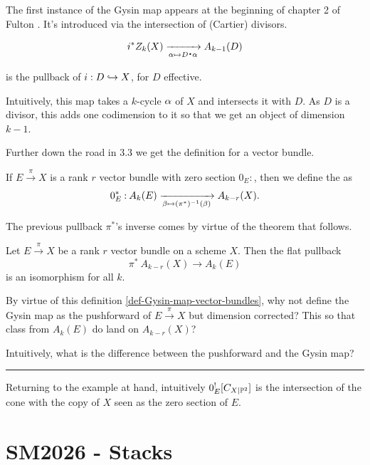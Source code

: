 \documentclass[12pt]{memoir}
\begin{document}
The first instance of the Gysin map appears at the beginning of chapter 2 of Fulton \cite{FultonIntersectionTheory}. It's introduced via the intersection of (Cartier) divisors.

\[
    i^\ast Z_k(X)\xrightarrow[\al\mapsto D\.\al]{} A_{k-1}(D)
\]

is the pullback of \(i:D\hookrightarrow X\), for \(D\) effective.\par
Intuitively, this map takes a \(k\)-cycle \(\alpha\) of \(X\) and intersects it with \(D\). As \(D\) is a divisor, this adds one codimension to it so that we get an object of dimension \(k-1\).\par
Further down the road in 3.3 we get the definition for a vector bundle.

\begin{Def}\label{def-Gysin-map-vector-bundles}
    If \(E\xrightarrow{\pi}X\) is a rank \(r\) vector bundle with zero section \(0_E:\), then we define the  as
    \[
        0^{\ast}_E\mathbin{:} A_k(E)\xrightarrow[\beta\mapsto (\pi^{\ast})^{-1}(\beta)]{}A_{k-r}(X).
    \]
\end{Def}

The previous pullback \(\pi^\ast\)'s inverse comes by virtue of the theorem that follows.

\begin{Th}
    Let \(E\xrightarrow{\pi}X\) be a rank \(r\) vector bundle on a scheme \(X\). Then the flat pullback
    \[
        \pi^{\ast}\: A_{k-r}(X)\to A_k(E)
    \]
    is an isomorphism for all \(k\).
\end{Th}

\begin{Qn}
    By virtue of this definition \ref{def-Gysin-map-vector-bundles}, why not define the Gysin map as the pushforward of \(E\xrightarrow{\pi}X\) but dimension corrected? This so that class from \(A_k(E)\) do land on \(A_{k-r}(X)\)?\par
    Intuitively, what is the difference between the pushforward and the Gysin map?
\end{Qn}


\hrule

Returning to the example at hand, intuitively \(0^!_E[C_{X|\mathbb{P}^2}]\) is the intersection of the cone with the copy of \(X\) seen as the zero section of \(E\).

\chapter{SM2026 - Stacks}
\end{document}
